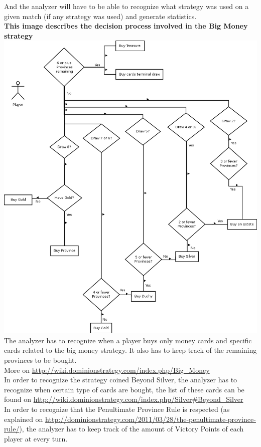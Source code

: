 \documentclass{scrreprt}
\begin{document}
And the analyzer will have to be able to recognize what strategy was used on a
given match (if any strategy was used) and generate statistics.\\
\newpage
\textbf{This image describes the decision process involved in the Big Money strategy}\\ 
\includegraphics[width=\textwidth,height=\textheight,keepaspectratio]{big-money}\\
The analyzer has to recognize when a player buys only money cards and specific cards related to the big money strategy. It also has to keep track of the remaining provinces to be bought.\\
More on \url{http://wiki.dominionstrategy.com/index.php/Big_Money}\\

In order to recognize the strategy coined Beyond Silver, the analyzer has to recognize when certain type of cards are bought, the list of these cards can be found on \url{http://wiki.dominionstrategy.com/index.php/Silver#Beyond_Silver}\\

In order to recognize that the Penultimate Province Rule is respected (as explained on \url{http://dominionstrategy.com/2011/03/28/the-penultimate-province-rule/}), the analyzer has to keep track of the amount of Victory Points of each player at every turn.
\end{document}
